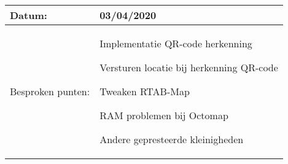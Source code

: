 \begin{tabularx}{\textwidth}{| l | X |}
  \hline
  Datum: & 03/04/2020\\
  \hline
  Besproken punten: &
  \begin{compactitem}
    \item Implementatie QR-code herkenning
    \item Versturen locatie bij herkenning QR-code
    \item Tweaken RTAB-Map
    \item RAM problemen bij Octomap
    \item Andere gepresteerde kleinigheden
  \end{compactitem}\\
  \hline
\end{tabularx}